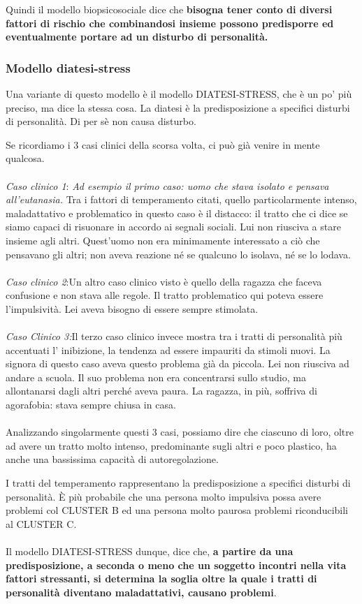 Quindi il modello biopsicosociale dice che \textbf{bisogna tener conto
di diversi fattori di rischio che combinandosi insieme possono
predisporre ed eventualmente portare ad un disturbo di personalità.}

\subsubsection{Modello diatesi-stress}

Una variante di questo modello è il modello DIATESI-STRESS, che è un po'
più preciso, ma dice la stessa cosa. La diatesi è la predisposizione a
specifici disturbi di personalità. Di per sè non causa disturbo.

Se ricordiamo i 3 casi clinici della scorsa volta, ci può già venire in
mente qualcosa.
\\\\
\emph{Caso clinico 1}: \emph{Ad esempio il primo caso: uomo che stava
isolato e pensava all'eutanasia.} Tra i fattori di temperamento citati,
quello particolarmente intenso, maladattativo e problematico in questo
caso è il distacco: il tratto che ci dice se siamo capaci di risuonare
in accordo ai segnali sociali. Lui non riusciva a stare insieme agli
altri. Quest'uomo non era minimamente interessato a ciò che pensavano
gli altri; non aveva reazione né se qualcuno lo isolava, né se lo
lodava.
\\\\
\emph{Caso clinico 2}:Un altro caso clinico visto è quello della ragazza
che faceva confusione e non stava alle regole. Il tratto problematico
qui poteva essere l'impulsività. Lei aveva bisogno di essere sempre
stimolata.
\\\\
\emph{Caso Clinico 3:}Il terzo caso clinico invece mostra tra i tratti
di personalità più accentuati l' inibizione, la tendenza ad essere
impauriti da stimoli nuovi. La signora di questo caso aveva questo
problema già da piccola. Lei non riusciva ad andare a scuola. Il suo
problema non era concentrarsi sullo studio, ma allontanarsi dagli altri
perché aveva paura. La ragazza, in più, soffriva di agorafobia: stava
sempre chiusa in casa.
\\\\
Analizzando singolarmente questi 3 casi, possiamo dire che ciascuno di
loro, oltre ad avere un tratto molto intenso, predominante sugli altri e
poco plastico, ha anche una bassissima capacità di autoregolazione.

I tratti del temperamento rappresentano la predisposizione a specifici
disturbi di personalità. È più probabile che una persona molto impulsiva
possa avere problemi col CLUSTER B ed una persona molto paurosa problemi
riconducibili al CLUSTER C.
\\\\
Il modello DIATESI-STRESS dunque, dice che, \textbf{a partire da una
predisposizione, a seconda o meno che un soggetto incontri nella vita
fattori stressanti, si determina la soglia oltre la quale i tratti di
personalità diventano maladattativi, causano problemi}.


